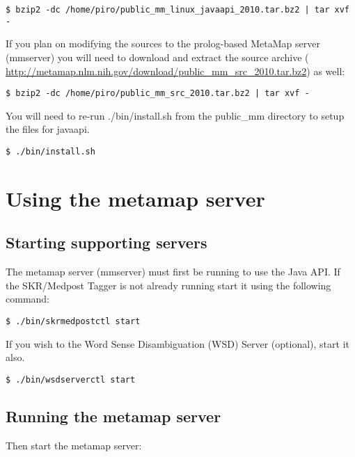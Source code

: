 \documentclass[11pt]{article}
\begin{document}
\begin{verbatim}
$ bzip2 -dc /home/piro/public_mm_linux_javaapi_2010.tar.bz2 | tar xvf -
\end{verbatim}

If you plan on modifying the sources to the prolog-based MetaMap
server (mmserver) you will need to download and extract the source
archive
( \url{http://metamap.nlm.nih.gov/download/public\_mm\_src\_2010.tar.bz2}) as
well:

\begin{verbatim}
$ bzip2 -dc /home/piro/public_mm_src_2010.tar.bz2 | tar xvf -
\end{verbatim}

You will need to re-run ./bin/install.sh from the public\_mm directory
to setup the files for javaapi.

\begin{verbatim}
$ ./bin/install.sh
\end{verbatim}

\section{Using the metamap server}
\label{Using the metamap server}

\subsection{Starting supporting servers}
\label{Starting supporting servers}

The metamap server (mmserver) must first be running to use the Java
API.  If the SKR/Medpost Tagger is not already running start it using
the following command:

\begin{verbatim}
$ ./bin/skrmedpostctl start
\end{verbatim}

If you wish to the Word Sense Disambiguation (WSD) Server (optional),
start it also.

\begin{verbatim}
$ ./bin/wsdserverctl start
\end{verbatim}

\subsection{Running the metamap server}
\label{Running the metamap server}

Then start the metamap server:
\end{document}
